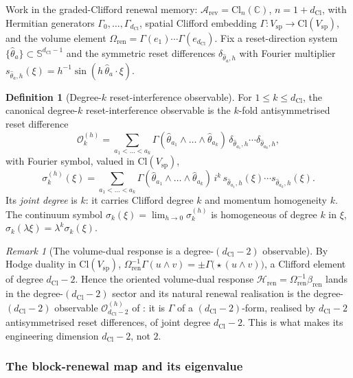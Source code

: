 \documentclass[11pt]{article}
\theoremstyle{definition}
\newtheorem{definition}[theorem]{Definition}
\theoremstyle{remark}
\newtheorem{remark}[theorem]{Remark}
\newcommand{\C}{\mathbb{C}}
\newcommand{\Arev}{\mathcal{A}_{\mathrm{rev}}}
\newcommand{\Cl}{\mathrm{Cl}}
\newcommand{\dCl}{d_{\mathrm{Cl}}}
\newcommand{\Sphere}{\mathbb{S}}
\newcommand{\Vsp}{V_{\mathrm{sp}}}
\newcommand{\Volr}{\Omega_{\mathrm{ren}}}
\newcommand{\Hren}{\mathcal{H}_{\mathrm{ren}}}
\newcommand{\bren}{\beta_{\mathrm{ren}}}
\newcommand{\Ocal}{\mathcal{O}}
\begin{document}
Work in the graded-Clifford renewal memory: $\Arev=\Cl_n(\C)$, $n=1+\dCl$, with
Hermitian generators $\Gamma_0,\dots,\Gamma_{\dCl}$, spatial Clifford embedding
$\Gamma:\Vsp\to\Cl(\Vsp)$, and the volume element
$\Volr=\Gamma(e_1)\cdots\Gamma(e_{\dCl})$.  Fix a reset-direction system
$\{\hat\theta_a\}\subset\Sphere^{\dCl-1}$ and the symmetric reset differences
$\delta_{\hat\theta_a,h}$ with Fourier multiplier
$s_{\hat\theta_a,h}(\xi)=h^{-1}\sin(h\,\hat\theta_a\cdot\xi)$.

\begin{definition}[Degree-$k$ reset-interference observable]
\label{def:degree-k-observable}
For $1\le k\le\dCl$, the canonical degree-$k$ reset-interference observable is the
$k$-fold antisymmetrised reset difference
\[
  \Ocal_k^{(h)}
  =\sum_{a_1<\dots<a_k}
   \Gamma(\hat\theta_{a_1}\wedge\dots\wedge\hat\theta_{a_k})\,
   \delta_{\hat\theta_{a_1},h}\cdots\delta_{\hat\theta_{a_k},h},
\]
with Fourier symbol, valued in $\Cl(\Vsp)$,
\[
  \sigma_k^{(h)}(\xi)
  =\sum_{a_1<\dots<a_k}
   \Gamma(\hat\theta_{a_1}\wedge\dots\wedge\hat\theta_{a_k})\,
   i^k\,s_{\hat\theta_{a_1},h}(\xi)\cdots s_{\hat\theta_{a_k},h}(\xi).
\]
Its \emph{joint degree} is $k$: it carries Clifford degree $k$ and momentum
homogeneity $k$.  The continuum symbol $\sigma_k(\xi)=\lim_{h\to0}\sigma_k^{(h)}$
is homogeneous of degree $k$ in $\xi$, $\sigma_k(\lambda\xi)=\lambda^k\sigma_k(\xi)$.
\end{definition}

\begin{remark}[The volume-dual response is a degree-$(\dCl-2)$ observable]
\label{rem:volume-dual-is-degree-d-2}
By Hodge duality in $\Cl(\Vsp)$, $\Volr^{-1}\Gamma(u\wedge v)
=\pm\Gamma\bigl(\star(u\wedge v)\bigr)$, a Clifford element of degree $\dCl-2$.
Hence the oriented volume-dual response $\Hren=\Volr^{-1}\bren$ lands in the
degree-$(\dCl-2)$ sector and its natural renewal realisation is the degree-$(\dCl-2)$
observable $\Ocal_{\dCl-2}^{(h)}$ of : it is
$\Gamma$ of a $(\dCl-2)$-form, realised by $\dCl-2$ antisymmetrised reset
differences, of joint degree $\dCl-2$.  This is what makes its engineering
dimension $\dCl-2$, not $2$.
\end{remark}

\subsubsection{The block-renewal map and its eigenvalue}
\end{document}
